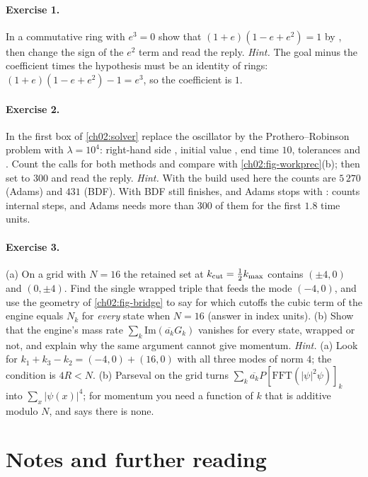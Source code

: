 \paragraph{Exercise 1.} In a commutative ring with $e^3=0$ show that $(1+e)(1-e+e^2)=1$ by , then change the sign of the $e^2$ term and read the reply. \emph{Hint.} The goal minus the coefficient times the hypothesis must be an identity of rings: $(1+e)(1-e+e^2)-1=e^3$, so the coefficient is $1$.

\paragraph{Exercise 2.} In the first box of \cref{ch02:solver} replace the oscillator by the Prothero--Robinson problem with $\lambda=10^4$: right-hand side , initial value \lean{[1.0]}, end time $10$, tolerances  and .
Count the calls for both methods and compare with \cref{ch02:fig-workprec}(b); then set  to $300$ and read the reply. \emph{Hint.} With the build used here the counts are $5\,270$ (Adams) and $431$ (BDF). With  BDF still finishes, and Adams stops with
:  counts internal steps, and Adams needs more than $300$ of them for the first $1.8$ time units.

\paragraph{Exercise 3.} (a) On a grid with $N=16$ the retained set at $k_{\rm cut}=\frac12k_{\max}$ contains $(\pm4,0)$ and $(0,\pm4)$. Find the single wrapped triple that feeds the mode $(-4,0)$, and use the geometry of \cref{ch02:fig-bridge} to say for which cutoffs the cubic term of the engine equals $N_k$ for \emph{every} state
when $N=16$ (answer in index units). (b) Show that the engine's mass rate $\sum_k\mathrm{Im}(\overline{a_k}G_k)$ vanishes for every state, wrapped or not, and explain why the same argument cannot give momentum.
\emph{Hint.} (a) Look for $k_1+k_3-k_2=(-4,0)+(16,0)$ with all three modes of norm $4$; the condition is $4R<N$. (b) Parseval on the grid turns $\sum_k\overline{a_k}P[\mathrm{FFT}(|\psi|^2\psi)]_k$ into $\sum_x|\psi(x)|^4$; for momentum you need a function of $k$ that is additive modulo $N$, and  says there is none.

\section{Notes and further reading}\label{ch02:notes}

